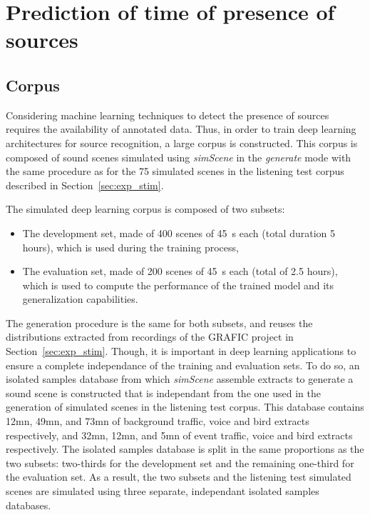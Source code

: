 \documentclass[twocolumn]{article}
\begin{document}
\section{Prediction of time of presence of sources}
\label{sec:pred}

\subsection{Corpus}
\label{sec:pred_corp}

Considering machine learning techniques to detect the presence of sources requires the availability of annotated data. Thus, in order to train deep learning architectures for source recognition, a large corpus is constructed. This corpus is composed of sound scenes simulated using \textit{simScene} in the \textit{generate} mode with the same procedure as for the 75 simulated scenes in the listening test corpus described in Section~\ref{sec:exp_stim}. 

The simulated deep learning corpus is composed of two subsets:
\begin{itemize}
\item The development set, made of 400 scenes of 45~s each (total duration 5 hours), which is used during the training process,
\item The evaluation set, made of 200 scenes of 45~s each (total of 2.5 hours), which is used to compute the performance of the trained model and its generalization capabilities.
\end{itemize}

The generation procedure is the same for both subsets, and reuses the distributions extracted from recordings of the GRAFIC project in Section~\ref{sec:exp_stim}. Though, it is important in deep learning applications to ensure a complete independance of the training and evaluation sets. To do so, an isolated samples database from which \textit{simScene} assemble extracts to generate a sound scene is constructed that is independant from the one used in the generation of simulated scenes in the listening test corpus. This database contains 12mn, 49mn, and 73mn of background traffic, voice and bird extracts respectively, and 32mn, 12mn, and 5mn of event traffic, voice and bird extracts respectively. The isolated samples database is split in the same proportions as the two subsets: two-thirds for the development set and the remaining one-third for the evaluation set. As a result, the two subsets and the listening test simulated scenes are simulated using three separate, independant isolated samples databases.
\end{document}
